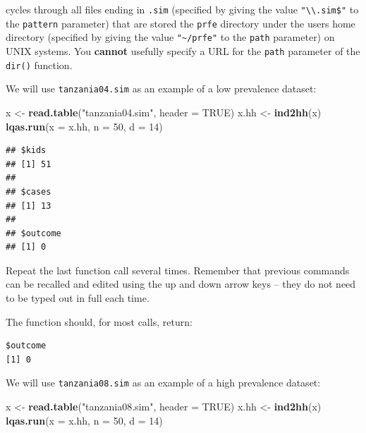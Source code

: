 \documentclass[12pt,a4paper]{book}
\newenvironment{Shaded}{\begin{snugshade}}{\end{snugshade}}
\newcommand{\KeywordTok}[1]{\textcolor[rgb]{0.13,0.29,0.53}{\textbf{#1}}}
\newcommand{\DataTypeTok}[1]{\textcolor[rgb]{0.13,0.29,0.53}{#1}}
\newcommand{\DecValTok}[1]{\textcolor[rgb]{0.00,0.00,0.81}{#1}}
\newcommand{\StringTok}[1]{\textcolor[rgb]{0.31,0.60,0.02}{#1}}
\newcommand{\OtherTok}[1]{\textcolor[rgb]{0.56,0.35,0.01}{#1}}
\newcommand{\NormalTok}[1]{#1}
\theoremstyle{definition}
\theoremstyle{definition}
\theoremstyle{definition}
\theoremstyle{remark}
\begin{document}
cycles through all files ending in \texttt{.sim} (specified by giving
the value \texttt{"\textbackslash{}\textbackslash{}.sim\$"} to the
\texttt{pattern} parameter) that are stored the \texttt{prfe} directory
under the users home directory (specified by giving the value
\texttt{"\textasciitilde{}/prfe"} to the \texttt{path} parameter) on
UNIX systems. You \textbf{cannot} usefully specify a URL for the
\texttt{path} parameter of the \texttt{dir()} function.

We will use \texttt{tanzania04.sim} as an example of a low prevalence
dataset:

\begin{Shaded}
\begin{Highlighting}[]
\NormalTok{x <-}\StringTok{ }\KeywordTok{read.table}\NormalTok{(}\StringTok{"tanzania04.sim"}\NormalTok{, }\DataTypeTok{header =} \OtherTok{TRUE}\NormalTok{)}
\NormalTok{x.hh <-}\StringTok{ }\KeywordTok{ind2hh}\NormalTok{(x)}
\KeywordTok{lqas.run}\NormalTok{(}\DataTypeTok{x =}\NormalTok{ x.hh, }\DataTypeTok{n =} \DecValTok{50}\NormalTok{, }\DataTypeTok{d =} \DecValTok{14}\NormalTok{)}
\end{Highlighting}
\end{Shaded}

\begin{verbatim}
## $kids
## [1] 51
## 
## $cases
## [1] 13
## 
## $outcome
## [1] 0
\end{verbatim}

Repeat the last function call several times. Remember that previous
commands can be recalled and edited using the up and down arrow keys --
they do not need to be typed out in full each time.

The function should, for most calls, return:

\begin{verbatim}
$outcome
[1] 0
\end{verbatim}

We will use \texttt{tanzania08.sim} as an example of a high prevalence
dataset:

\begin{Shaded}
\begin{Highlighting}[]
\NormalTok{x <-}\StringTok{ }\KeywordTok{read.table}\NormalTok{(}\StringTok{"tanzania08.sim"}\NormalTok{, }\DataTypeTok{header =} \OtherTok{TRUE}\NormalTok{)}
\NormalTok{x.hh <-}\StringTok{ }\KeywordTok{ind2hh}\NormalTok{(x)}
\KeywordTok{lqas.run}\NormalTok{(}\DataTypeTok{x =}\NormalTok{ x.hh, }\DataTypeTok{n =} \DecValTok{50}\NormalTok{, }\DataTypeTok{d =} \DecValTok{14}\NormalTok{)}
\end{Highlighting}
\end{Shaded}
\end{document}
